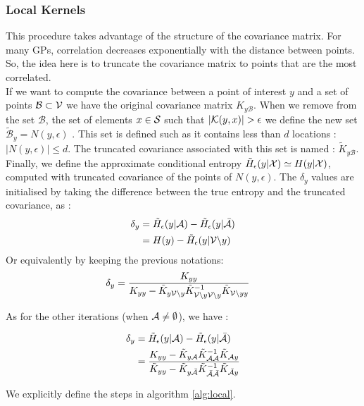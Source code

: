 \subsubsection{Local Kernels} This procedure takes advantage of the structure of the covariance matrix. For many GPs, correlation decreases exponentially with the distance between points. So, the idea here is to truncate the covariance matrix to points that are the most correlated. \\ 

If we want to compute the covariance between a point of interest $y$ and a set of points $\mathcal{B} \subset \V $ we have the original covariance matrix $K_{y\mathcal{B}}$. When we remove from the set $\mathcal{B}$, the set of elements  $x \in \S$ such that $|\K(y,x)| > \epsilon $ we define the new set  $\tilde{\mathcal{B}}_y = N(y,\epsilon)$ . This set is defined such as it contains less than $d$ locations : $|N(y,\epsilon)| \leq d $. The truncated covariance associated with this set is named : $\tilde{K}_{y\mathcal{B}}$. Finally, we define the approximate conditional entropy $\tilde{H}_\epsilon(y | \X) \simeq H(y | \X)$, computed with truncated covariance of the points of $N(y,\epsilon)$. The $\delta_y$ values are initialised by taking the difference between the true entropy and the truncated covariance, as :
\begin{align}
    \delta_y &= \tilde{H}_\epsilon(y | \A) - \tilde{H}_\epsilon(y | \bar{\A}) \\
            &= H(y) - \tilde{H}_\epsilon(y | \V \backslash y )
\end{align}
Or equivalently by keeping the previous notations: 
\begin{align}
    \delta_y &= \frac{K_{yy} }{K_{yy} - \tilde{K}_{y\V \backslash y} \tilde{K}_{\V \backslash y \V \backslash y}^{-1} \tilde{K}_{\V \backslash y y} } \label{equ:initLocal}
\end{align}


As for the other iterations (when $\A \neq \emptyset$), we have : 

\begin{align}
    \delta_y &= \tilde{H}_\epsilon(y | \A) - \tilde{H}_\epsilon(y | \bar{\A}) \\
    &= \frac{K_{yy} - \tilde{K}_{y\A} \tilde{K}_{\A\A}^{-1} \tilde{K}_{\A y} }{\tilde{K}_{yy} - \tilde{K}_{y\bar{\A}} \tilde{K}_{\bar{\A}\bar{\A}}^{-1} \tilde{K}_{\bar{\A} y} } \label{equ:updateLocal}
\end{align}


We explicitly define the steps in algorithm \ref{alg:local}. \\

